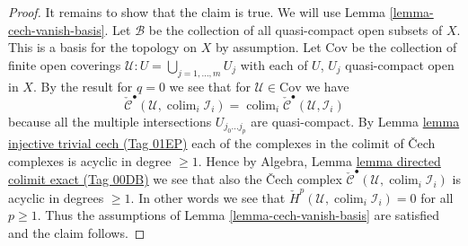 \documentclass{amsart}
\theoremstyle{plain}
\theoremstyle{definition}
\theoremstyle{remark}
\numberwithin{equation}{subsection}
\def\colim{\mathop{\mathrm{colim}}\nolimits}
\begin{document}
\begin{proof}
\medskip\noindent
It remains to show that the claim is true. We will use
Lemma \ref{lemma-cech-vanish-basis}.
Let $\mathcal{B}$ be the collection of all quasi-compact open
subsets of $X$. This is a basis for the topology on $X$ by assumption.
Let $\text{Cov}$ be the collection of finite open coverings
$\mathcal{U} : U = \bigcup_{j = 1, \ldots, m} U_j$ with each
of $U$, $U_j$ quasi-compact open in $X$. By the result for $q = 0$
we see that for $\mathcal{U} \in \text{Cov}$ we have
$$
\check{\mathcal{C}}^\bullet(\mathcal{U}, \colim_i \mathcal{I}_i)
=
\colim_i \check{\mathcal{C}}^\bullet(\mathcal{U}, \mathcal{I}_i)
$$
because all the multiple intersections $U_{j_0 \ldots j_p}$
are quasi-compact. By Lemma \href{https://stacks.math.columbia.edu/tag/01EP}{lemma injective trivial cech (Tag 01EP)}
each of the complexes in the colimit of {\v C}ech complexes is
acyclic in degree $\geq 1$. Hence by
Algebra, Lemma \href{https://stacks.math.columbia.edu/tag/00DB}{lemma directed colimit exact (Tag 00DB)}
we see that also the {\v C}ech complex
$\check{\mathcal{C}}^\bullet(\mathcal{U}, \colim_i \mathcal{I}_i)$
is acyclic in degrees $\geq 1$. In other words we see that
$\check{H}^p(\mathcal{U},  \colim_i \mathcal{I}_i) = 0$
for all $p \geq 1$. Thus the assumptions of
Lemma \ref{lemma-cech-vanish-basis} are satisfied and the claim follows.
\end{proof}
\end{document}
